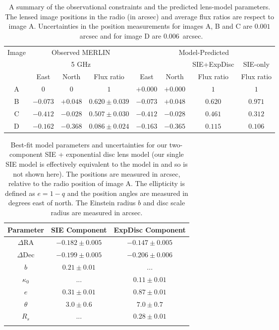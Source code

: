 \documentclass[a4paper,fleqn,usenatbib,useAMS]{mnras}
\begin{document}
\begin{table}
\centering
\caption{A summary of the observational constraints and the predicted lens-model parameters. The lensed image positions in the radio \citep{Marlow99} (in arcsec) and average flux ratios \citep{K03} are respect to image A. Uncertainties in the position measurements for images A, B and C are $0.001$~arcsec and for image D are $0.006$~arcsec.}
\begin{tabular}{cccccccc}
\hline
Image	&\multicolumn{3}{c}{Observed MERLIN} 	 	& \multicolumn{4}{c}{Model-Predicted}\\
		&\multicolumn{3}{c}{5 GHz}		& & & {SIE+ExpDisc} & SIE-only\\
		&East &North & Flux ratio &East 	&North & Flux ratio &Flux ratio\\ 
\hline
A  &$0$    		&$0$			&  $1$ 				&$+0.000$  &$+0.000$	& $1$ 		& $1$\\  
B  &$-0.073$	&$+0.048$	& $0.620 \pm 0.039$ 	&$-0.073$ &$+0.048$		& $0.620$ 	& $0.971$ \\  
C  &$-0.412$ 	&$-0.028$	& $0.507\pm 0.030$	&$-0.412$ &$-0.028$		& $0.461$ 	& $0.312$\\  
D  &$-0.162$	&$-0.368$	& $0.086 \pm 0.024$ 	&$-0.163$ &$-0.365$		& $0.115$ 	& $0.106$\\  
\hline
\end{tabular}
\label{tab:results}
\end{table}

\begin{table}
\centering
\caption{Best-fit model parameters and uncertainties for our two-component SIE + exponential disc lens model (our single SIE model is effectively equivalent to the model in \citet{Marlow99} and so is not shown here). The positions are measured in arcsec, relative to the radio position of image A. The ellipticity is defined as $e=1-q$ and the position angles are measured in degrees east of north. The Einstein radius $b$ and disc scale radius are measured in arcsec.}
\begin{tabular}{ccc}
\hline 
Parameter    & SIE Component & ExpDisc Component  \\
\hline
$\Delta$RA	& $-0.182 \pm 0.005$		& $-0.147 \pm 0.005$\\
$\Delta$Dec	& $-0.199 \pm 0.005$		& $-0.206 \pm 0.006$ \\
$b$ 			& $0.21 \pm 0.01$  		& ...  \\
$\kappa_0$ & ... &$0.11 \pm 0.01$\\
$e$	  		& $0.31 \pm 0.01$			& $0.87 \pm 0.01$ \\
$\theta$ 		& $3.0 \pm 0.6$			& $7.0 \pm 0.7$	 \\
$R_s$			& ...  						& $0.28 \pm 0.01$	 \\
\hline
\label{tab:model}
\end{tabular}
\end{table}
\end{document}
